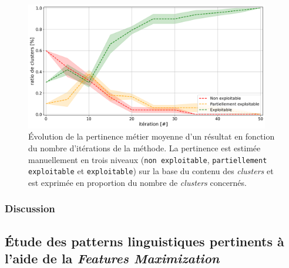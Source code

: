 			
			
			\begin{figure}[!htb]
				\centering
				\includegraphics[width=0.95\textwidth]{figures/etude-pertinence-llm-check-clustering-annotation-favori}
				\caption{Évolution de la pertinence métier moyenne d'un résultat en fonction du nombre d'itérations de la méthode.
				La pertinence est estimée manuellement en trois niveaux (\texttt{non exploitable}, \texttt{partiellement exploitable} et \texttt{exploitable}) sur la base du contenu des \textit{clusters} et est exprimée en proportion du nombre de \textit{clusters} concernés.}
				\label{figure:4.4.1-ETUDE-PERTINENCE-VERIFICATION-MANUELLE}
			\end{figure}

		\subsubsection{Discussion}
		
			
	
	
	\subsection{Étude des patterns linguistiques pertinents à l'aide de la \textit{Features Maximization}}
	\label{section:4.4.2-ETUDE-PERTINENCE-PATTERNS-LINGUISTIQUES}
		
